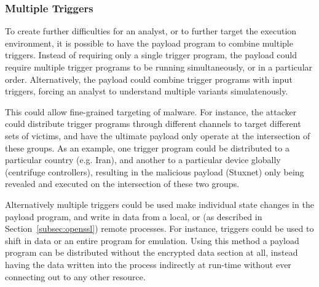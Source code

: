 \subsubsection{Multiple Triggers}
To create further difficulties for an analyst, or to further target the
execution environment, it is possible to have the payload program to combine
multiple triggers. Instead of requiring only a single trigger program,
the payload could require multiple trigger programs to be running
simultaneously, or in a particular order. Alternatively, the payload could combine
trigger programs with input triggers, forcing an analyst to understand multiple
variants simulatenously.

This could allow fine-grained targeting of malware. For instance, the attacker
could distribute trigger programs through different channels to target different sets
of victims, and have the ultimate payload only operate at the intersection of
these groups. As an example, one trigger program could be distributed to a
particular country (e.g. Iran), and another to a particular device globally
(centrifuge controllers), resulting in the malicious payload (Stuxnet) only
being revealed and executed on the intersection of these two groups.


\smallskip

Alternatively multiple triggers could be used make individual state changes in
the payload program, and write in data from a local, or (as described in
Section~\ref{subsec:openssl}) remote processes. For instance, triggers could be
used to shift in data or an entire program for emulation.
Using this method a payload
program can be distributed without the encrypted data section at all,
instead having the data written into the process indirectly at run-time without ever
connecting out to any other resource.

